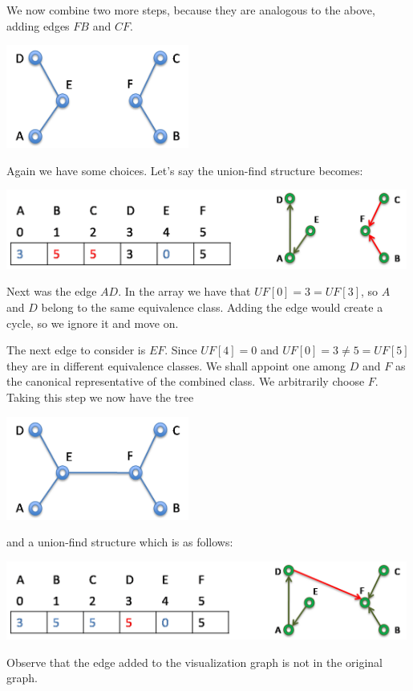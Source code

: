 We now combine two more steps, because they are analogous to the above,
adding edges $FB$ and $CF$.
\begin{center}
  \includegraphics[width=0.45\textwidth]{img/forest4.png}
\end{center}
Again we have some choices.  Let's say the union-find structure
becomes:
\begin{center}
  \includegraphics[width=0.99\textwidth]{img/ufsg4.png}
\end{center}

Next was the edge $AD$.  In the array we have that $\mathit{UF}[0] = 3 =
\mathit{UF}[3]$, so $A$ and $D$ belong to the same equivalence class.  Adding
the edge would create a cycle, so we ignore it and move on.

The next edge to consider is $EF$.  Since $\mathit{UF}[4] = 0$ and $\mathit{UF}[0] = 3
\neq 5 = \mathit{UF}[5]$ they are in different equivalence classes.  We shall
appoint one among $D$ and $F$ as the canonical representative of the
combined class.  We arbitrarily choose $F$.  Taking this step we now
have the tree
\begin{center}
  \includegraphics[width=0.45\textwidth]{img/forest5.png}
\end{center}
and a union-find structure which is as follows:
\begin{center}
  \includegraphics[width=0.99\textwidth]{img/ufsg5.png}
\end{center}
Observe that the edge added to the visualization graph is not in the
original graph.

